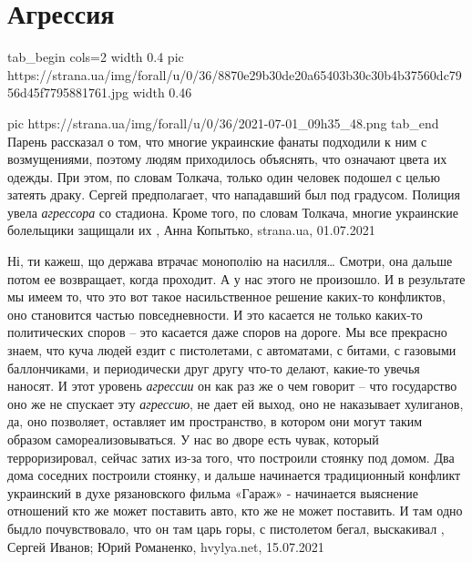  
 
 
 
 
\chapter{Агрессия}
\label{sec:slova.agressia}

\ifcmt
  tab_begin cols=2
		width 0.4
     pic https://strana.ua/img/forall/u/0/36/8870e29b30de20a65403b30c30b4b37560dc7956d45f7795881761.jpg
		width 0.46

     pic https://strana.ua/img/forall/u/0/36/2021-07-01_09h35_48.png
  tab_end
\fi
Парень рассказал о том, что многие украинские фанаты подходили к ним с
возмущениями, поэтому людям приходилось объяснять, что означают цвета их
одежды. При этом, по словам Толкача, только один человек подошел с целью
затеять драку. Сергей предполагает, что нападавший был под градусом.
Полиция увела \emph{агрессора} со стадиона.
Кроме того, по словам Толкача, многие украинские болельщики защищали их
, 
Анна Копытько, strana.ua, 01.07.2021

Ні, ти кажеш, що держава втрачає монополію на насилля… Смотри, она дальше потом
ее возвращает, когда проходит. А у нас этого не произошло. И в результате мы
имеем то, что это вот такое насильственное решение каких-то конфликтов, оно
становится частью повседневности. И это касается не только каких-то
политических споров – это касается даже споров на дороге. Мы все прекрасно
знаем, что куча людей ездит с пистолетами, с автоматами, с битами, с газовыми
баллончиками, и периодически друг другу что-то делают, какие-то увечья наносят.
И этот уровень \emph{агрессии} он как раз же о чем говорит – что государство оно же не
спускает эту \emph{агрессию}, не дает ей выход, оно не наказывает хулиганов, да, оно
позволяет, оставляет им пространство, в котором они могут таким образом
самореализовываться.  У нас во дворе есть чувак, который терроризировал, сейчас
затих из-за того, что построили стоянку под домом. Два дома соседних построили
стоянку, и дальше начинается традиционный конфликт украинский в духе
рязановского фильма «Гараж» - начинается выяснение отношений кто же может
поставить авто, кто же не может поставить. И там одно быдло почувствовало, что
он там царь горы, с пистолетом бегал, выскакивал
, 
Сергей Иванов; Юрий Романенко, hvylya.net, 15.07.2021


